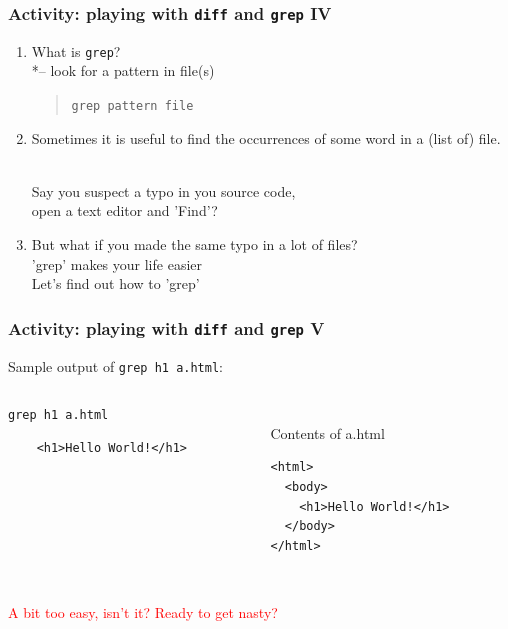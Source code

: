 \documentclass[a4paper]{beamer}
\newcommand{\cmd}[1]{\begin{quote}{\tt #1}\end{quote}}
\begin{document}
\begin{frame}
\frametitle{Activity: playing with \texttt{diff} and \texttt{grep} IV}
\begin{enumerate}
\item What is \texttt{grep}?
\\*-- look for a pattern in file(s)

\cmd{grep pattern file}

\item Sometimes it is useful to find the occurrences of some word in a (list of) file.

\\ Say you suspect a typo in you source code,
\\ open a text editor and 'Find'?

\pause

\item But what if you made the same typo in a lot of files?
\pause
\\ 'grep' makes your life easier
\\ Let's find out how to 'grep'

\end{enumerate}
\end{frame}


\begin{frame}[fragile]
\frametitle{Activity: playing with \texttt{diff} and \texttt{grep} V}
Sample output of \texttt{grep h1 a.html}:

\begin{columns}
\begin{column}{0.5\textwidth}
\texttt{grep h1 a.html}

\begin{verbatim}
    <h1>Hello World!</h1>
\end{verbatim}
\end{column}

\begin{column}{0.5\textwidth}
\\Contents of a.html
\begin{verbatim}
<html>
  <body>
    <h1>Hello World!</h1>
  </body>
</html>
\end{verbatim}
\end{column}
\end{columns}

\pause
\\ \textcolor{red}{A bit too easy, isn't it? Ready to get nasty?}
\end{frame}
\end{document}

